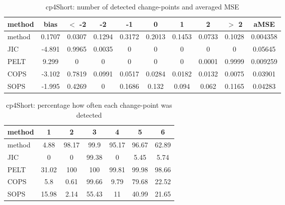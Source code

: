 \begin{table}[ht]
\centering
\begin{tabular}{l|c|ccccccc|c}
  \hline
method & bias & $<$ -2 & -2 & -1 & 0 & 1 & 2 & $>$ 2 & aMSE \\ 
  \hline
method & 0.1707 & 0.0307 & 0.1294 & 0.3172 & 0.2013 & 0.1453 & 0.0733 & 0.1028 & 0.004358 \\ 
  JIC & -4.891 & 0.9965 & 0.0035 &     0 &     0 &     0 &     0 &     0 & 0.05645 \\ 
  PELT & 9.299 &     0 &     0 &     0 &     0 &     0 & 0.0001 & 0.9999 & 0.009259 \\ 
  COPS & -3.102 & 0.7819 & 0.0991 & 0.0517 & 0.0284 & 0.0182 & 0.0132 & 0.0075 & 0.03901 \\ 
  SOPS & -1.995 & 0.4269 &     0 & 0.1686 & 0.132 & 0.094 & 0.062 & 0.1165 & 0.04283 \\ 
   \hline
\end{tabular}
\caption{cp4Short: number of detected change-points and averaged MSE} 
\label{tab:cp4ShortNjumps}
\end{table}
\begin{table}[ht]
\centering
\begin{tabular}{l|cccccc}
  \hline
method & 1 & 2 & 3 & 4 & 5 & 6 \\ 
  \hline
method &   4.88 &  98.17 &   99.9 &  95.17 &  96.67 &  62.89 \\ 
  JIC &      0 &      0 &  99.38 &      0 &   5.45 &   5.74 \\ 
  PELT &  31.02 &    100 &    100 &  99.81 &  99.98 &  98.66 \\ 
  COPS &    5.8 &   0.61 &  99.66 &   9.79 &  79.68 &  22.52 \\ 
  SOPS &  15.98 &   2.14 &  55.43 &     11 &  40.99 &  21.65 \\ 
   \hline
\end{tabular}
\caption{cp4Short: percentage how often each change-point was detected} 
\label{tab:cp4ShortDetections}
\end{table}
